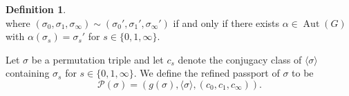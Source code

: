 \documentclass{dcthesis}
\newcommand{\defi}[1]{\textsf{#1}}
\newcommand{\mm}[1]{{\color{blue} \sf MM: [#1]}}
\newcommand{\QQal}{{\mathbb Q}^{\textup{al}}}
\newcommand{\QQab}{{\mathbb Q}^{\textup{ab}}}
\DeclareMathOperator{\Aut}{Aut}
\DeclareMathOperator{\Gal}{Gal}
\numberwithin{equation}{section}
\newtheorem{theorem}[equation]{Theorem}
\theoremstyle{definition}
\newtheorem{definition}[equation]{Definition}
\theoremstyle{remark}
\begin{document}
{{{\begin{definition}
\begin{equation}
      \end{equation}
      where $(\sigma_0,\sigma_1,\sigma_\infty)\sim(\sigma_0', \sigma_1', \sigma_\infty')$
      if and only if there exists $\alpha\in\Aut(G)$ with
      $\alpha(\sigma_s) = \sigma_s'$ for $s\in\{0,1,\infty\}$.
      \par
      Let $\sigma$ be a
      permutation triple
      and let $c_s$ denote the conjugacy
      class of $\langle\sigma\rangle$
      containing $\sigma_s$ for
      $s\in \{0,1,\infty\}$.
      We define the
      \defi{refined passport of $\sigma$}
      to be
      \begin{equation}
        \label{eqn:refinedpassportofsigma}
        \mathscr{P}(\sigma)
        =(g(\sigma), \langle\sigma\rangle, (c_0,c_1,c_\infty)).
      \end{equation}
    \end{definition}
  }
}}
\end{document}
